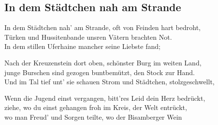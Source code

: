 
\subsection*{In dem Städtchen nah am Strande}
%
%


\thestrophe In dem Städtchen nah' am Strande, oft von Feinden hart bedroht, \\
Türken und Hussitenbande unsren Vätern brachten Not. \\
In dem stillen Uferhaine mancher seine Liebste fand; \\

\thestrophe Nach der Kreuzenstein dort oben, schönster Burg im weiten Land, \\
junge Burschen sind gezogen buntbemützt, den Stock zur Hand. \\
Und im Tal tief unt' sie schauen Strom und Städtchen, stolzgeschwellt, \\ 

\thestrophe Wenn die Jugend einst vergangen, bitt'res Leid dein Herz bedrückt, \\
ziehe, wo du einst gehangen froh im Kreis, der Welt entrückt, \\
wo man Freud' und Sorgen teilte, wo der Bisamberger Wein \\
